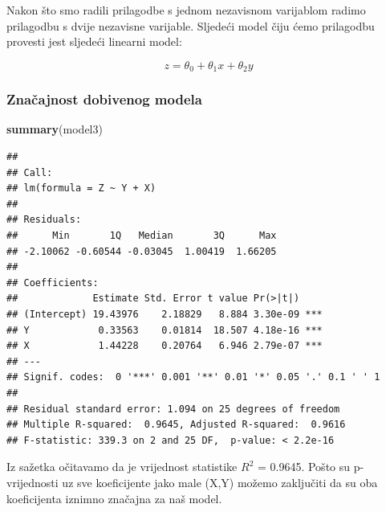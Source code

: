\documentclass[]{article}
\newenvironment{Shaded}{\begin{snugshade}}{\end{snugshade}}
\newcommand{\KeywordTok}[1]{\textcolor[rgb]{0.13,0.29,0.53}{\textbf{{#1}}}}
\newcommand{\StringTok}[1]{\textcolor[rgb]{0.31,0.60,0.02}{{#1}}}
\newcommand{\NormalTok}[1]{{#1}}
\begin{document}
Nakon što smo radili prilagodbe s jednom nezavisnom varijablom radimo
prilagodbu s dvije nezavisne varijable. Sljedeći model čiju ćemo
prilagodbu provesti jest sljedeći linearni model:

\begin{equation}
z = \theta_0 + \theta_1 x + \theta_2 y
\end{equation}

\begin{Shaded}
\end{Shaded}

\subsubsection{Značajnost dobivenog
modela}\label{znacajnost-dobivenog-modela}

\begin{Shaded}
\begin{Highlighting}[]
\KeywordTok{summary}\NormalTok{(model3)}
\end{Highlighting}
\end{Shaded}

\begin{verbatim}
## 
## Call:
## lm(formula = Z ~ Y + X)
## 
## Residuals:
##      Min       1Q   Median       3Q      Max 
## -2.10062 -0.60544 -0.03045  1.00419  1.66205 
## 
## Coefficients:
##             Estimate Std. Error t value Pr(>|t|)    
## (Intercept) 19.43976    2.18829   8.884 3.30e-09 ***
## Y            0.33563    0.01814  18.507 4.18e-16 ***
## X            1.44228    0.20764   6.946 2.79e-07 ***
## ---
## Signif. codes:  0 '***' 0.001 '**' 0.01 '*' 0.05 '.' 0.1 ' ' 1
## 
## Residual standard error: 1.094 on 25 degrees of freedom
## Multiple R-squared:  0.9645, Adjusted R-squared:  0.9616 
## F-statistic: 339.3 on 2 and 25 DF,  p-value: < 2.2e-16
\end{verbatim}

Iz sažetka očitavamo da je vrijednost statistike \(R^2\) = 0.9645. Pošto
su p-vrijednosti uz sve koeficijente jako male (X,Y) možemo zaključiti
da su oba koeficijenta iznimno značajna za naš model.
\end{document}
